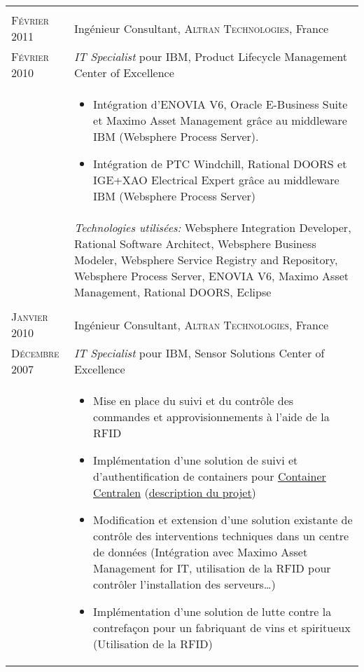 \begin{longtable}{R{2.5cm}|p{14.8cm}}
  \\
 	\textsc{Février 2011} & Ingénieur Consultant, \textsc{Altran Technologies}, France\\
 	\textsc{Février 2010}& \emph{IT Specialist} pour IBM, Product Lifecycle Management Center of Excellence\\&
  \vspace{-1em}
 	\footnotesize{
 		\begin{itemize}
 			\item Intégration d'ENOVIA V6, Oracle E-Business Suite et Maximo Asset Management grâce au middleware IBM (Websphere Process Server).
 			\item Intégration de PTC Windchill, Rational DOORS et IGE+XAO Electrical Expert grâce au middleware IBM (Websphere Process Server)
 		\end{itemize}
 		\vspace{-1em}
 	}\\&
 	\footnotesize{\emph{Technologies utilisées:} Websphere Integration Developer, Rational Software Architect, Websphere Business Modeler, Websphere Service Registry and Repository, 
 	Websphere Process Server, ENOVIA V6, Maximo Asset Management, Rational DOORS, Eclipse }\\
  \\
 	\textsc{Janvier 2010} & Ingénieur Consultant, \textsc{Altran Technologies}, France\\
 	\textsc{Décembre 2007}& \emph{IT Specialist} pour IBM, Sensor Solutions Center of Excellence\\&
  \vspace{-1em}
 	\footnotesize{
 		\begin{itemize}
 		  \item Mise en place du suivi et du contrôle des commandes et approvisionnements à l'aide de la RFID
 		  \item Implémentation d'une solution de suivi et d'authentification de containers pour \href{http://www.container-centralen.com/}{Container Centralen} (\href{http://www.container-centralen.co.uk/rfid/history.aspx}{description du projet})
 		  \item Modification et extension d'une solution existante de contrôle des interventions techniques dans un centre de données 
 	 	(Intégration avec Maximo Asset Management for IT, utilisation de la RFID pour contrôler l'installation des serveurs\ldots)
 	 	  \item Implémentation d'une solution de lutte contre la contrefaçon pour un fabriquant de vins et spiritueux (Utilisation de la RFID)

\end{itemize}}
\end{longtable}
